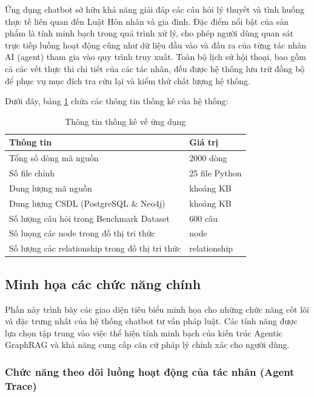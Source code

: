 \documentclass[../DoAn.tex]{subfiles}
\begin{document}
Ứng dụng chatbot sở hữu khả năng giải đáp các câu hỏi lý thuyết và tình huống thực tế liên quan đến Luật Hôn nhân và gia đình. Đặc điểm nổi bật của sản phẩm là tính minh bạch trong quá trình xử lý, cho phép người dùng quan sát trực tiếp luồng hoạt động cũng như dữ liệu đầu vào và đầu ra của từng tác nhân AI (agent) tham gia vào quy trình truy xuất. Toàn bộ lịch sử hội thoại, bao gồm cả các vết thực thi chi tiết của các tác nhân, đều được hệ thống lưu trữ đồng bộ để phục vụ mục đích tra cứu lại và kiểm thử chất lượng hệ thống.

Dưới đây, bảng \ref{tab:summary_stats} chứa các thông tin thống kê của hệ thống:

\begin{table}[H]
\centering
\begin{tabular}{|l|l|}
\hline
\textbf{Thông tin} & \textbf{Giá trị} \\ \hline
Tổng số dòng mã nguồn & 2000 dòng \\ \hline
Số file chính & 25 file Python \\ \hline
Dung lượng mã nguồn & khoảng KB \\ \hline
Dung lượng CSDL (PostgreSQL \& Neo4j) & khoảng KB \\ \hline
Số lượng câu hỏi trong Benchmark Dataset & 600 câu \\ \hline
Số luọng các node trong đồ thị tri thức & node \\ \hline 
Số lượng các relationship trong đồ thị tri thức & relationship \\ \hline
\end{tabular}
\caption{Thông tin thống kê về ứng dụng}
\label{tab:summary_stats}
\end{table}

\subsection{Minh họa các chức năng chính}
\label{subsection:4.8}

Phần này trình bày các giao diện tiêu biểu minh họa cho những chức năng cốt lõi và đặc trưng nhất của hệ thống chatbot tư vấn pháp luật. Các tính năng được lựa chọn tập trung vào việc thể hiện tính minh bạch của kiến trúc Agentic GraphRAG và khả năng cung cấp căn cứ pháp lý chính xác cho người dùng.

\subsubsection{Chức năng theo dõi luồng hoạt động của tác nhân (Agent Trace)}
\end{document}
